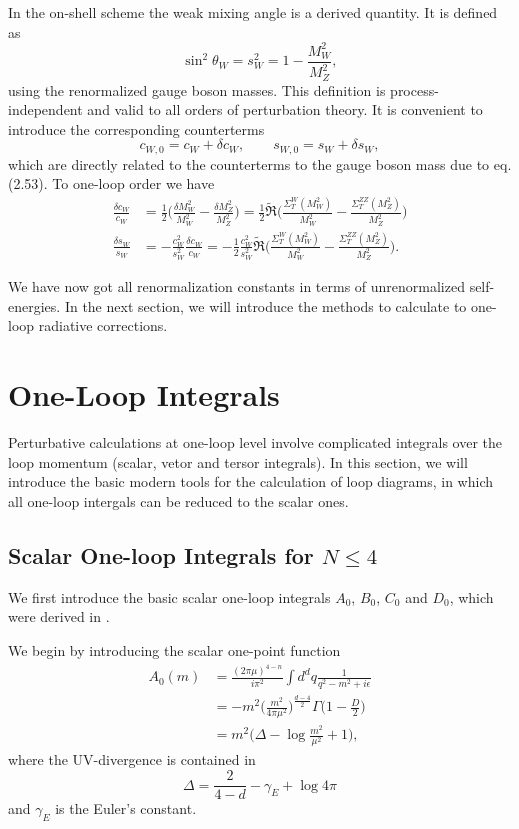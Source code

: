 In the on-shell scheme the weak mixing angle is a derived quantity. It is defined as \cite{Sirlin,Marcianosirlin,SirlinMaciano}
\begin{equation}
\sin^2\theta_W=s^2_W=1-\frac{M^2_W}{M^2_Z},
\end{equation}
using the renormalized gauge boson masses. This definition is process-independent and valid to all orders of perturbation theory. It is convenient to introduce the corresponding counterterms
\begin{equation}
c_{W,0}=c_W+\delta c_W,\quad\quad s_{W,0}=s_W+\delta s_W,
\end{equation}
which are directly related to the counterterms to the gauge boson mass due to eq. (2.53). To one-loop order we have
\begin{align}
\frac{\delta c_W}{c_W}&=\frac{1}{2}\biggl(\frac{\delta M^2_W}{M_W^2}-\frac{\delta M^2_Z}{M_Z^2}\biggr)=\frac{1}{2}\widetilde{\Re}\biggl(\frac{\Sigma^W_T(M_W^2)}{M_W^2}-\frac{\Sigma^{ZZ}_T(M_Z^2)}{M_Z^2}\biggr)\nonumber\\
\frac{\delta s_W}{s_W}&=-\frac{c^2_W}{s^2_W}\frac{\delta c_W}{c_W}
=-\frac{1}{2}\frac{c^2_W}{s^2_W}\widetilde{\Re}\biggl(\frac{\Sigma^W_T(M_W^2)}{M_W^2}-\frac{\Sigma^{ZZ}_T(M_Z^2)}{M_Z^2}\biggr).
\end{align}

We have now got all renormalization constants in terms of unrenormalized self-energies. In the next section, we will introduce the methods to calculate to one-loop radiative corrections. 

\section{One-Loop Integrals}
Perturbative calculations at one-loop level involve complicated integrals over the loop momentum (scalar, vetor and tersor integrals). In this section, we will introduce the basic modern tools for the calculation of loop diagrams\cite{Denner,PV,DG,tHscarlar}, in which all one-loop intergals can be reduced to the scalar ones.  

\subsection{Scalar One-loop Integrals for $N\leq 4$}
We first introduce the basic scalar one-loop integrals $A_0$, $B_0$, $C_0$ and $D_0$, which were derived in \cite{tHscarlar}. 

We begin by introducing the scalar one-point function
\begin{align}
A_0(m)&=\frac{{(2\pi\mu)}^{4-n}}{i\pi^2}\int d^d q\frac{1}{q^2-m^2+i\epsilon}\nonumber\\
&=-m^2\biggl(\frac{m^2}{4\pi\mu^2}\biggr)^\frac{d-4}{2}\Gamma\bigg(1-\frac{D}{2}\bigg)\nonumber\\
&= m^2\bigg( \Delta-\log\frac{m^2}{\mu^2}+1\bigg),
\end{align} 
where the UV-divergence is contained in
\begin{equation}
\Delta=\frac{2}{4-d}-\gamma_E+\log 4\pi
\end{equation}
and $\gamma_E$ is the Euler's constant. 

